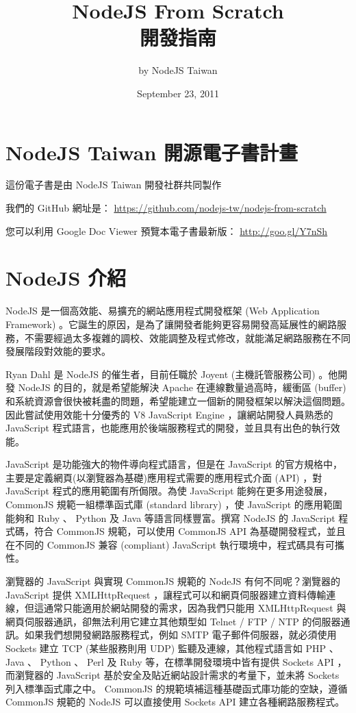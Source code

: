 \documentclass[a4paper,12pt,english]{sphinxmanual}
\title{NodeJS From Scratch\\開發指南}
\date{September 23, 2011}
\author{by NodeJS Taiwan}
\begin{document}
\maketitle
\tableofcontents
{}\label{index::doc}



\chapter{NodeJS Taiwan 開源電子書計畫}
\label{README:nodejs-from-scratch}\label{README::doc}\label{README:nodejs-taiwan}
這份電子書是由 NodeJS Taiwan 開發社群共同製作

我們的 GitHub 網址是：
\href{https://github.com/nodejs-tw/nodejs-from-scratch}{https://github.com/nodejs-tw/nodejs-from-scratch}

您可以利用 Google Doc Viewer 預覽本電子書最新版：
\href{http://goo.gl/Y7nSh}{http://goo.gl/Y7nSh}


\chapter{NodeJS 介紹}
\label{nodejs_intro::doc}\label{nodejs_intro:nodejs}
NodeJS 是一個高效能、易擴充的網站應用程式開發框架 (Web Application Framework) 。它誕生的原因，是為了讓開發者能夠更容易開發高延展性的網路服務，不需要經過太多複雜的調校、效能調整及程式修改，就能滿足網路服務在不同發展階段對效能的要求。

Ryan Dahl 是 NodeJS 的催生者，目前任職於 Joyent (主機託管服務公司) 。他開發 NodeJS 的目的，就是希望能解決 Apache 在連線數量過高時，緩衝區 (buffer) 和系統資源會很快被耗盡的問題，希望能建立一個新的開發框架以解決這個問題。因此嘗試使用效能十分優秀的 V8 JavaScript Engine ，讓網站開發人員熟悉的 JavaScript 程式語言，也能應用於後端服務程式的開發，並且具有出色的執行效能。

JavaScript 是功能強大的物件導向程式語言，但是在 JavaScript 的官方規格中，主要是定義網頁(以瀏覽器為基礎)應用程式需要的應用程式介面 (API) ，對 JavaScript 程式的應用範圍有所侷限。為使 JavaScript 能夠在更多用途發展， CommonJS 規範一組標準函式庫 (standard library) ，使 JavaScript 的應用範圍能夠和 Ruby 、 Python 及 Java 等語言同樣豐富。撰寫 NodeJS 的 JavaScript 程式碼，符合 CommonJS 規範，可以使用 CommonJS API 為基礎開發程式，並且在不同的 CommonJS 兼容 (compliant) JavaScript 執行環境中，程式碼具有可攜性。

瀏覽器的 JavaScript 與實現 CommonJS 規範的 NodeJS 有何不同呢？瀏覽器的 JavaScript 提供 XMLHttpRequest ，讓程式可以和網頁伺服器建立資料傳輸連線，但這通常只能適用於網站開發的需求，因為我們只能用 XMLHttpRequest 與網頁伺服器通訊，卻無法利用它建立其他類型如 Telnet / FTP / NTP 的伺服器通訊。如果我們想開發網路服務程式，例如 SMTP 電子郵件伺服器，就必須使用 Sockets 建立 TCP (某些服務則用 UDP) 監聽及連線，其他程式語言如 PHP 、 Java 、 Python 、 Perl 及 Ruby 等，在標準開發環境中皆有提供 Sockets API ，而瀏覽器的 JavaScript 基於安全及貼近網站設計需求的考量下，並未將 Sockets 列入標準函式庫之中。 CommonJS 的規範填補這種基礎函式庫功能的空缺，遵循 CommonJS 規範的 NodeJS 可以直接使用 Sockets API 建立各種網路服務程式。
\end{document}
